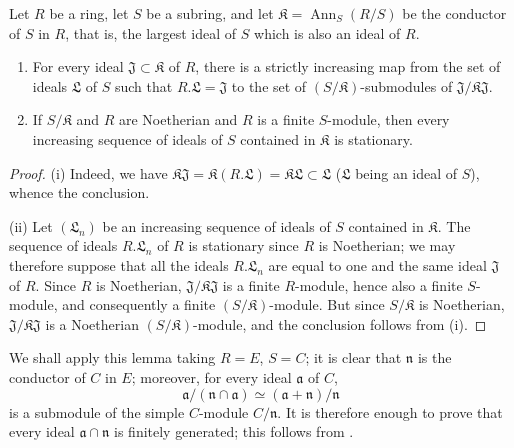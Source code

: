 \begin{example}[5.6.11]
\begin{lemma}[5.6.11.1]
\label{IV.5.6.11.1}
Let $R$ be a ring, let $S$ be a subring, and let $\mathfrak K=\operatorname{Ann}_S(R/S)$
be the conductor of $S$ in $R$, that is, the largest ideal of $S$
which is also an ideal of $R$.
\begin{enumerate}[{\rm(i)}]
\item
{}
\label{IV.5.6.11.1.i}
For every ideal $\mathfrak J\subset\mathfrak K$ of $R$, there is a
strictly increasing map from the set of ideals $\mathfrak L$ of $S$
such that $R.\mathfrak L=\mathfrak J$ to the set of
$(S/\mathfrak K)$-submodules of
$\mathfrak J/\mathfrak K\mathfrak J$.

\item
{}
\label{IV.5.6.11.1.ii}
If $S/\mathfrak K$ and $R$ are Noetherian and $R$ is a finite
$S$-module, then every increasing sequence of ideals of $S$
contained in $\mathfrak K$ is stationary.
\end{enumerate}
\end{lemma}

\begin{proof}
(i) Indeed, we have $\mathfrak K\mathfrak J
=\mathfrak K(R.\mathfrak L)
=\mathfrak K\mathfrak L
\subset\mathfrak L$ ($\mathfrak L$ being an ideal of $S$), whence the
conclusion.

(ii) Let $(\mathfrak L_n)$ be an increasing sequence of ideals
of $S$ contained in $\mathfrak K$.  The sequence of ideals
$R.\mathfrak L_n$ of $R$ is stationary since $R$ is Noetherian; we may
therefore suppose that all the ideals $R.\mathfrak L_n$ are equal to one
and the same ideal $\mathfrak J$ of $R$.  Since $R$ is Noetherian,
$\mathfrak J/\mathfrak K\mathfrak J$ is a finite $R$-module, hence also
a finite $S$-module, and consequently a finite $(S/\mathfrak K)$-module.
But since $S/\mathfrak K$ is Noetherian,
$\mathfrak J/\mathfrak K\mathfrak J$ is a Noetherian
$(S/\mathfrak K)$-module, and the conclusion follows from (i).
\end{proof}

We shall apply this lemma taking $R=E$, $S=C$; it is clear that
$\mathfrak n$ is the conductor of $C$ in $E$; moreover, for every ideal
$\mathfrak a$ of $C$,
\[
\mathfrak a/(\mathfrak n\cap\mathfrak a)
 \simeq(\mathfrak a+\mathfrak n)/\mathfrak n
\]
is a submodule of the simple $C$-module $C/\mathfrak n$.  It is
therefore enough to prove that every ideal
$\mathfrak a\cap\mathfrak n$ is finitely generated; this follows
from .


\end{example}
